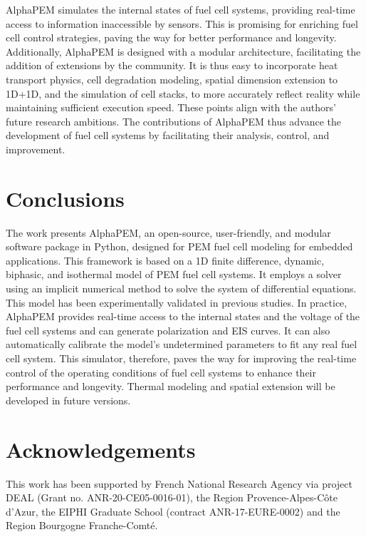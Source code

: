 \documentclass[postprint,3p,times]{elsarticle}
\begin{document}
AlphaPEM simulates the internal states of fuel cell systems, providing real-time access to information inaccessible by sensors. This is promising for enriching fuel cell control strategies, paving the way for better performance and longevity. Additionally, AlphaPEM is designed with a modular architecture, facilitating the addition of extensions by the community. It is thus easy to incorporate heat transport physics, cell degradation modeling, spatial dimension extension to 1D+1D, and the simulation of cell stacks, to more accurately reflect reality while maintaining sufficient execution speed. These points align with the authors' future research ambitions. The contributions of AlphaPEM thus advance the development of fuel cell systems by facilitating their analysis, control, and improvement.


\section{Conclusions}

The work presents AlphaPEM, an open-source, user-friendly, and modular software package in Python, designed for PEM fuel cell modeling for embedded applications. This framework is based on a 1D finite difference, dynamic, biphasic, and isothermal model of PEM fuel cell systems. It employs a solver using an implicit numerical method to solve the system of differential equations. This model has been experimentally validated in previous studies. In practice, AlphaPEM provides real-time access to the internal states and the voltage of the fuel cell systems and can generate polarization and EIS curves. It can also automatically calibrate the model's undetermined parameters to fit any real fuel cell system. This simulator, therefore, paves the way for improving the real-time control of the operating conditions of fuel cell systems to enhance their performance and longevity. Thermal modeling and spatial extension will be developed in future versions.


\section*{Acknowledgements}
This work has been supported by French National Research Agency via project DEAL (Grant no. ANR-20-CE05-0016-01), the Region Provence-Alpes-Côte d'Azur, the EIPHI Graduate School (contract ANR-17-EURE-0002) and the Region Bourgogne Franche-Comté.

\appendix
\end{document}
